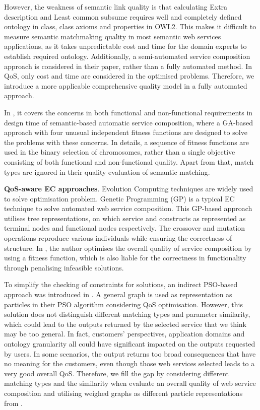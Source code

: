 \documentclass{llncs}
\begin{document}
However, the weakness of semantic link quality is that calculating Extra description and Least common subsume requires well and completely defined ontology in class, class axioms and properties in OWL2. This makes it difficult to measure semantic matchmaking quality in most semantic web services applications, as it takes unpredictable cost and time for the domain experts to establish required ontology. Additionally, a semi-automated service composition approach is considered in their paper, rather than a fully automated method. In QoS, only cost and time are considered in the optimised problems. Therefore, we introduce a more applicable comprehensive quality model in a fully automated approach.

In \cite{fanjiang2014semantic}, it covers the concerns in both functional and non-functional requirements in design time of semantic-based automatic service composition, where a GA-based approach with four unusual independent fitness functions are designed to solve the problems with these concerns. In details, a sequence of fitness functions are used in the binary selection of chromosomes, rather than a single objective consisting of both functional and non-functional quality. Apart from that, match types are ignored in their quality evaluation of semantic matching.

\textbf{QoS-aware EC approaches}. Evolution Computing techniques are widely used to solve optimisation problem. Genetic Programming (GP) \cite{da2016particle,da2015graphevol} is a typical EC technique to solve automated web service composition. This GP-based approach utilises tree representations, on which service and constructs as represented as terminal nodes and functional nodes respectively. The crossover and mutation operations reproduce various individuals while ensuring the correctness of structure. In \cite{yu2013adaptive}, the author optimises the overall quality of service composition by using a fitness function, which is also liable for the correctness in functionality through penalising infeasible solutions. 

To simplify the checking of constraints for solutions, an indirect PSO-based approach was introduced in \cite{da2016particle}. A general graph is used as representation as particles in their PSO algorithm considering QoS optimisation. However, this solution does not distinguish different matching types and parameter similarity, which could lead to the outputs returned by the selected service that we think may be too general. In fact, customers' perspectives, application domains and ontology granularity all could have significant impacted on the outputs requested by users. In some scenarios, the output returns too broad consequences that have no meaning for the customers, even though those web services selected leads to a very good overall QoS. Therefore, we fill the gap by considering different matching types and the similarity when evaluate an overall quality of web service composition and utilising weighed graphs as different particle representations from \cite{da2016particle}.
\end{document}

